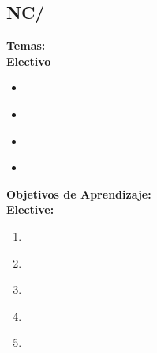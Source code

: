 \subsection{NC/\NCSocialNetworking}\label{sec:BOK:NCSocialNetworking}
\noindent \textbf{Temas:}\\
\noindent \textbf{Electivo}
\begin{itemize}
	\item \NCSocialNetworkingTopicSocial\label{sec:BOK:NCSocialNetworkingTopicSocial}
	\item \NCSocialNetworkingTopicExample\label{sec:BOK:NCSocialNetworkingTopicExample}
	\item \NCSocialNetworkingTopicStructure\label{sec:BOK:NCSocialNetworkingTopicStructure}
	\item \NCSocialNetworkingTopicSocialNetwork\label{sec:BOK:NCSocialNetworkingTopicSocialNetwork}
\end{itemize}


\noindent \textbf{Objetivos de Aprendizaje:}\\
\noindent \textbf{Elective:}
\begin{enumerate}
	\setcounter{enumi}{0}
	\item \NCSocialNetworkingLODiscussTheSuch\xspace[\NCSocialNetworkingLODiscussTheSuchLevel]\label{sec:BOK:NCSocialNetworkingLODiscussTheSuch}
	\item \NCSocialNetworkingLODescribeHowNetworks\xspace[\NCSocialNetworkingLODescribeHowNetworksLevel]\label{sec:BOK:NCSocialNetworkingLODescribeHowNetworks}
	\item \NCSocialNetworkingLOConstructA\xspace[\NCSocialNetworkingLOConstructALevel]\label{sec:BOK:NCSocialNetworkingLOConstructA}
	\item \NCSocialNetworkingLOAnalyzeATo\xspace[\NCSocialNetworkingLOAnalyzeAToLevel]\label{sec:BOK:NCSocialNetworkingLOAnalyzeATo}
	\item \NCSocialNetworkingLOEvaluateAOf\xspace[\NCSocialNetworkingLOEvaluateAOfLevel]\label{sec:BOK:NCSocialNetworkingLOEvaluateAOf}
\end{enumerate}




\section{\OS}\label{sec:BOK:OS}
\OSBOKDescription


